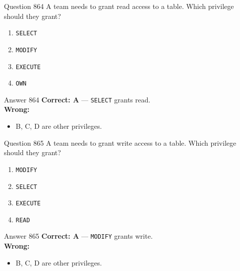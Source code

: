 \documentclass[aspectratio=169,11pt]{beamer}
\begin{document}
	\begin{frame}{Question 864}
		A team needs to grant read access to a table. Which privilege should they grant?
		\begin{enumerate}[label=\Alph*.]
			\item \texttt{SELECT}
			\item \texttt{MODIFY}
			\item \texttt{EXECUTE}
			\item \texttt{OWN}
		\end{enumerate}
	\end{frame}
	\begin{frame}{Answer 864}
		\textbf{Correct: A} --- \texttt{SELECT} grants read.\\
		\vspace{0.5em}
		\textbf{Wrong:}
		\begin{itemize}
			\item B, C, D are other privileges.
		\end{itemize}
	\end{frame}
	
	\begin{frame}{Question 865}
		A team needs to grant write access to a table. Which privilege should they grant?
		\begin{enumerate}[label=\Alph*.]
			\item \texttt{MODIFY}
			\item \texttt{SELECT}
			\item \texttt{EXECUTE}
			\item \texttt{READ}
		\end{enumerate}
	\end{frame}
	\begin{frame}{Answer 865}
		\textbf{Correct: A} --- \texttt{MODIFY} grants write.\\
		\vspace{0.5em}
		\textbf{Wrong:}
		\begin{itemize}
			\item B, C, D are other privileges.
		\end{itemize}
	\end{frame}
	
\end{document}
